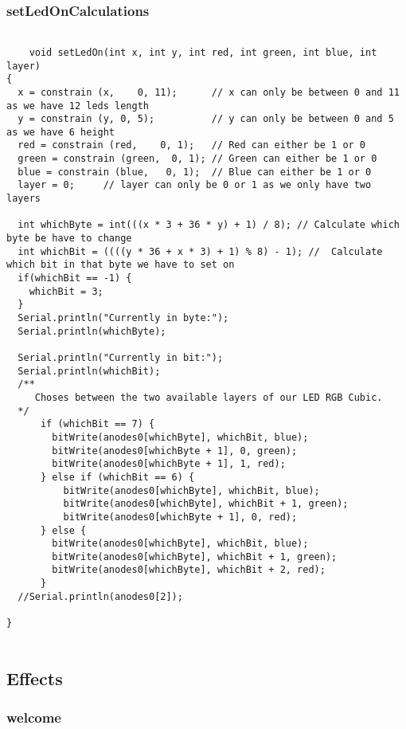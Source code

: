 \documentclass[12pt,a4paper]{article}
\begin{document}
\subsubsection{setLedOnCalculations}

\begin{lstlisting}[language=Arduino]

    void setLedOn(int x, int y, int red, int green, int blue, int layer)
{
  x = constrain (x,    0, 11);      // x can only be between 0 and 11 as we have 12 leds length
  y = constrain (y, 0, 5);          // y can only be between 0 and 5 as we have 6 height
  red = constrain (red,    0, 1);   // Red can either be 1 or 0
  green = constrain (green,  0, 1); // Green can either be 1 or 0
  blue = constrain (blue,   0, 1);  // Blue can either be 1 or 0
  layer = 0;     // layer can only be 0 or 1 as we only have two layers

  int whichByte = int(((x * 3 + 36 * y) + 1) / 8); // Calculate which byte be have to change
  int whichBit = ((((y * 36 + x * 3) + 1) % 8) - 1); //  Calculate which bit in that byte we have to set on
  if(whichBit == -1) {
    whichBit = 3;
  }
  Serial.println("Currently in byte:");
  Serial.println(whichByte);

  Serial.println("Currently in bit:");
  Serial.println(whichBit);
  /**
     Choses between the two available layers of our LED RGB Cubic.
  */
      if (whichBit == 7) {
        bitWrite(anodes0[whichByte], whichBit, blue);
        bitWrite(anodes0[whichByte + 1], 0, green);
        bitWrite(anodes0[whichByte + 1], 1, red);
      } else if (whichBit == 6) {
          bitWrite(anodes0[whichByte], whichBit, blue);
          bitWrite(anodes0[whichByte], whichBit + 1, green);
          bitWrite(anodes0[whichByte + 1], 0, red);
      } else {
        bitWrite(anodes0[whichByte], whichBit, blue);
        bitWrite(anodes0[whichByte], whichBit + 1, green);
        bitWrite(anodes0[whichByte], whichBit + 2, red);
      }
  //Serial.println(anodes0[2]);

}
    
\end{lstlisting}

\subsection{Effects}

\subsubsection{welcome}
\end{document}
